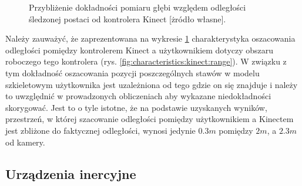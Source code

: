 	\pgfplotsset{width=12cm,compat=1.8}
		
	\begin{figure}
		\centering
				
		\caption{Przybliżenie dokładności pomiaru głębi względem odległości śledzonej postaci od kontrolera Kinect [żródło własne].}
		\label{fig:characteristics:kinect:distanceAccuracy}
	\end{figure}
		
	Należy zauważyć, że zaprezentowana na wykresie \ref{fig:characteristics:kinect:distanceAccuracy} charakterystyka oszacowania odległości pomiędzy kontrolerem Kinect a użytkownikiem dotyczy obszaru roboczego tego kontrolera (rys. \ref{fig:characteristics:kinect:range}). W związku z tym dokładność oszacowania pozycji poszczególnych stawów w modelu szkieletowym użytkownika jest uzależniona od tego gdzie on się znajduje i należy to uwzględnić w prowadzonych obliczeniach aby wykazane niedokładności skorygować.
 Jest to o tyle istotne, że na podstawie uzyskanych wyników, przestrzeń, w której szacowanie odległości pomiędzy użytkownikiem a Kinectem jest zbliżone do faktycznej odległości, wynosi jedynie $0.3m$ pomiędzy $2m$, a $2.3m$ od kamery.  


		
	\subsection{Urządzenia inercyjne}\label{sec:characteristics:imu}
		
